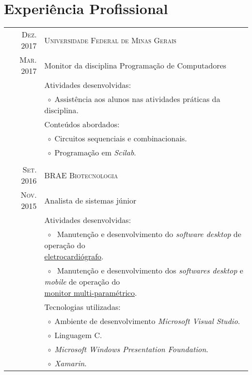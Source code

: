 \documentclass[a4paper,10pt]{article}
\newcommand{\tabitem}{$\;\circ\;$}
\renewcommand\#{\protect\scalebox{0.8}{\protect\raisebox{0.4ex}{\char"0023}}}
\begin{document}
\section{Experiência Profissional}
\begin{tabular}{r|p{12.3cm}}
  \textsc{Dez. 2017} & \textsc{Universidade Federal de Minas Gerais} \\
  \textsc{Mar. 2017} & Monitor da disciplina Programação de Computadores \\[5pt]
  & Atividades desenvolvidas: \\
  & \tabitem Assistência aos alunos nas atividades práticas da disciplina. \\
  & Conteúdos abordados: \\
  & \tabitem Circuitos sequenciais e combinacionais. \\
  & \tabitem Programação em \textit{Scilab}. \\
  
  \multicolumn{2}{c}{} \\
  \textsc{Set. 2016} & \textsc{BRAE Biotecnologia} \\
  \textsc{Nov. 2015} & Analista de sistemas júnior \\[5pt]
  & Atividades desenvolvidas: \\
  & \tabitem \makecell[lt] {
              Manutenção e desenvolvimento do \textit{software desktop} de operação do \\
              \href{http://www.ferox.vet.br/pt-br/produtos/ecg-veterinario.aspx}{eletrocardiógrafo}.
             }\\
  & \tabitem \makecell[lt]{
              Manutenção e desenvolvimento dos \textit{softwares desktop} e \textit{mobile} de operação do \\
              \href{http://www.ferox.com.br/pt-br/produtos/monitor-multiparametrico/monitorfx4000.aspx}{monitor multi-paramétrico}.
             }\\[-3pt]
  & Tecnologias utilizadas: \\
  & \tabitem Ambiente de desenvolvimento \textit{Microsoft Visual Studio}. \\
  & \tabitem Linguagem C\#. \\
  & \tabitem \textit{Microsoft Windows Presentation Foundation}. \\
  & \tabitem \textit{Xamarin}. \\
  

\end{tabular}
\end{document}
